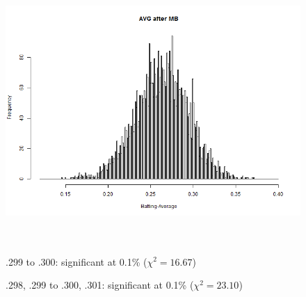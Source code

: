 \documentclass[dvipdfmx]{article}
\begin{document}
 \begin{figure}[H]
   \centering
   \includegraphics[width = 14cm, height = 10cm]
   {graphs/AVG_afmb}

   .299 to .300: significant at 0.1\% ($\chi^2 = 16.67$)

   .298, .299 to .300, .301: significant at 0.1\% ($\chi^2 = 23.10$)
 \end{figure}

 \begin{landscape}
   

   
 \end{landscape}

 \begin{landscape}
   

   
 \end{landscape}

 \begin{landscape}
   

   
 \end{landscape}

  
  
\end{document}
